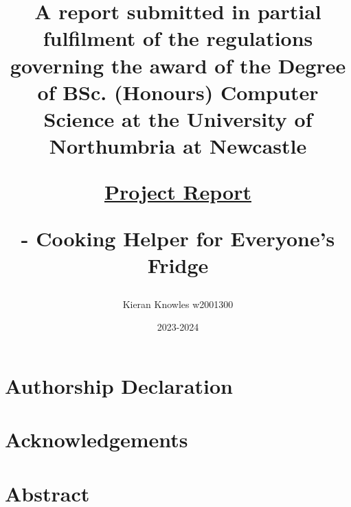 \documentclass[11pt, twoside, a4paper]{report}
\begin{document}

\title{
    A report submitted in partial fulfilment of the regulations governing the award of the Degree of
    BSc. (Honours) Computer Science at the University of Northumbria at Newcastle

    \underline{Project Report}

    \chef{} - Cooking Helper for Everyone's Fridge
}
\author{Kieran Knowles w2001300}
\date{2023-2024}
\maketitle


\chapter*{Authorship Declaration}


\chapter*{Acknowledgements}

\chapter*{Abstract}


\renewcommand{\contentsname}{List of Contents}
\tableofcontents
{}
\end{document}
